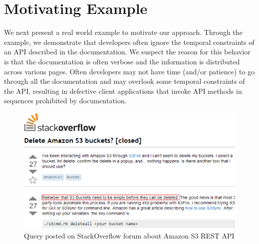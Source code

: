 \section{Motivating Example}
\label{sec:example}
\vspace*{-1ex}
We next present a real world example to motivate our approach.
Through the example, we demonstrate that developers often ignore the temporal constraints of an API described in the documentation.
We suspect the reason for this behavior is that the documentation is often verbose and the information is distributed across various pages.
Often developers may not have time (and/or patience) to go through all the documentation and may overlook some temporal constraints of the API,
resulting in defective client applications that invoke API methods in sequences prohibited by documentation. 

\begin{figure}[t]
	\begin{center}
		\includegraphics[scale=0.45]{Stackoverflow.eps}
	\end{center}
	\vspace*{-3ex}
	\caption{\label{fig:Stackoverflow} Query posted on StackOverflow forum about Amazon S3 REST API}
	\vspace*{-3ex}
\end{figure}

